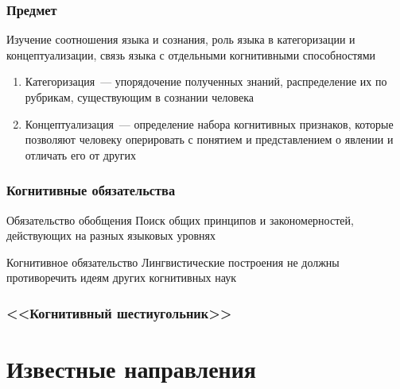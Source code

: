 \begin{frame}
  \frametitle{Предмет}
  Изучение соотношения языка и сознания, роль языка в категоризации и концептуализации, связь языка с отдельными когнитивными способностями

  \vfill

  \begin{enumerate}
    \item Категоризация~--- упорядочение полученных знаний, распределение их по рубрикам, существующим в сознании человека
    \item Концептуализация~--- определение набора когнитивных признаков, которые позволяют человеку оперировать с понятием и представлением о явлении и отличать его от других
  \end{enumerate}
\end{frame}

\begin{frame}
  \frametitle{Когнитивные обязательства}

  \begin{exampleblock}{Обязательство обобщения}
    Поиск общих принципов и закономерностей, действующих на разных языковых уровнях
  \end{exampleblock}

  \begin{exampleblock}{Когнитивное обязательство}
    Лингвистические построения не должны противоречить идеям других когнитивных наук
  \end{exampleblock}
\end{frame}

\begin{frame}
  \frametitle{<<Когнитивный шестиугольник>>}

  \begin{center}
  \end{center}
\end{frame}

\section{Известные направления}
\frame{\tableofcontents[currentsection]}

